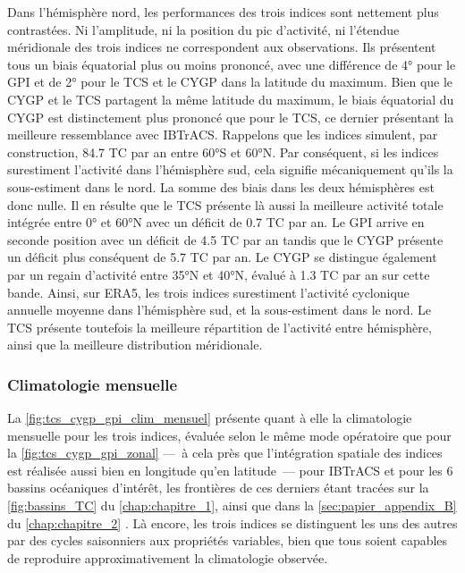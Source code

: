 \documentclass[../main.tex]{subfiles}
\begin{document}
Dans l'hémisphère nord, les performances des trois indices sont nettement plus contrastées. Ni l'amplitude, ni la position du pic d'activité, ni l'étendue
méridionale des trois indices ne correspondent aux observations. Ils présentent tous un biais équatorial plus ou moins prononcé, avec une différence de \ang{4}
pour le GPI et de \ang{2} pour le TCS et le CYGP dans la latitude du maximum. Bien que le CYGP et le TCS partagent la même latitude du maximum, le biais
équatorial du CYGP est distinctement plus prononcé que pour le TCS, ce dernier présentant la meilleure ressemblance avec IBTrACS. Rappelons que les indices
simulent, par construction, \num{84.7} TC par an entre \ang{60}S et \ang{60}N. Par conséquent, si les indices surestiment l'activité dans l'hémisphère sud, cela
signifie mécaniquement qu'ils la sous-estiment dans le nord. La somme des biais dans les deux hémisphères est donc nulle. Il en résulte que le TCS présente là
aussi la meilleure activité totale intégrée entre \ang{0} et \ang{60}N avec un déficit de \num{0.7} TC par an. Le GPI arrive en seconde position avec un déficit
de \num{4.5} TC par an tandis que le CYGP présente un déficit plus conséquent de \num{5.7} TC par an. Le CYGP se distingue également par un regain d'activité
entre \ang{35}N et \ang{40}N, évalué à \num{1.3} TC par an sur cette bande. Ainsi, sur ERA5, les trois indices surestiment l'activité cyclonique annuelle
moyenne dans l'hémisphère sud, et la sous-estiment dans le nord. Le TCS présente toutefois la meilleure répartition de l'activité entre hémisphère, ainsi que la
meilleure distribution méridionale.

\subsubsection*{Climatologie mensuelle}

La \cref{fig:tcs_cygp_gpi_clim_mensuel} présente quant à elle la climatologie mensuelle pour les trois indices, évaluée selon le même mode opératoire que pour
la \cref{fig:tcs_cygp_gpi_zonal} ---~à cela près que l'intégration spatiale des indices est réalisée aussi bien en longitude qu'en latitude~--- pour IBTrACS et
pour les 6 bassins océaniques d'intérêt, les frontières de ces derniers étant tracées sur la \cref{fig:bassins_TC} du \cref{chap:chapitre_1}, ainsi que dans la
\cref{sec:papier_appendix_B} du \cref{chap:chapitre_2} \parencite[][documents supplémentaires]{dulac_assessing_2023}. Là encore, les trois indices se
distinguent les uns des autres par des cycles saisonniers aux propriétés variables, bien que tous soient capables de reproduire approximativement la
climatologie observée. 
\end{document}
